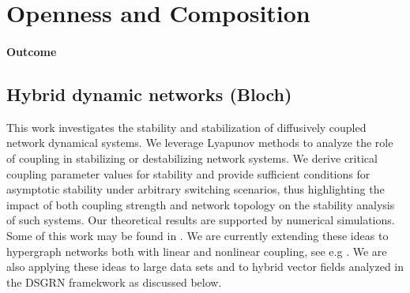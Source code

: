 \documentclass[letterpaper,11pt]{article}
\newcommand{\dg}[1]{{\textcolor{blue}{#1}}}
\begin{document}
\vspace*{0.3cm}

\section{Openness and Composition}
\paragraph*{Outcome}
\subsection{Hybrid dynamic networks (Bloch)}

This work investigates the stability and stabilization of diffusively coupled network dynamical systems. We leverage Lyapunov methods to analyze the role of coupling in stabilizing or destabilizing network systems. We derive critical coupling parameter values for stability and provide sufficient conditions for asymptotic stability under arbitrary switching scenarios, thus highlighting the impact of both coupling strength and network topology on the stability analysis of such systems. Our theoretical results are supported by numerical simulations. Some of this work may be found in \cite{mouyebe2025coupling}.  We are currently 
extending these ideas to hypergraph networks both with linear and nonlinear coupling, see e.g \cite{pickard2024kronecker}. We are also applying these ideas 
to large data sets and to hybrid vector fields analyzed in the DSGRN framekwork as discussed below. 
\end{document}
